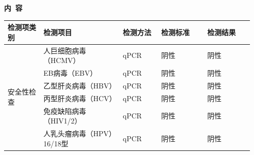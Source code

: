 \documentclass[UTF8,10pt,a4paper,fontset=fandol]{ctexart}
\newcommand{\fieldvalue}[1]{#1}
\begin{document}
\begin{center}
\textbf{内\ 容}
\end{center}

\begin{tabular}{|p{0.14\linewidth}|p{0.31\linewidth}|p{0.15\linewidth}|p{0.18\linewidth}|p{0.18\linewidth}|}
\hline
检测项类别 & 检测项目 & 检测方法 & 检测标准 & 检测结果\\ \hline
\multirow{12}{*}{安全性检查}
& %
\fieldvalue{人巨细胞病毒（HCMV）}
& %
\fieldvalue{qPCR}
& %
\fieldvalue{阴性}
& %
\fieldvalue{阴性}
\\ \cline{2-5}
& %
\fieldvalue{EB病毒（EBV）}
& %
\fieldvalue{qPCR}
& %
\fieldvalue{阴性}
& %
\fieldvalue{阴性}
\\ \cline{2-5}
& %
\fieldvalue{乙型肝炎病毒（HBV）}
& %
\fieldvalue{qPCR}
& %
\fieldvalue{阴性}
& %
\fieldvalue{阴性}
\\ \cline{2-5}
& %
\fieldvalue{丙型肝炎病毒（HCV）}
& %
\fieldvalue{qPCR}
& %
\fieldvalue{阴性}
& %
\fieldvalue{阴性}
\\ \cline{2-5}
& %
\fieldvalue{免疫缺陷病毒（HIV1/2）}
& %
\fieldvalue{qPCR}
& %
\fieldvalue{阴性}
& %
\fieldvalue{阴性}
\\ \cline{2-5}
& %
\fieldvalue{人乳头瘤病毒（HPV）16/18型}
& %
\fieldvalue{qPCR}
& %
\fieldvalue{阴性}
& %
\fieldvalue{阴性}

\end{tabular}
\end{document}
